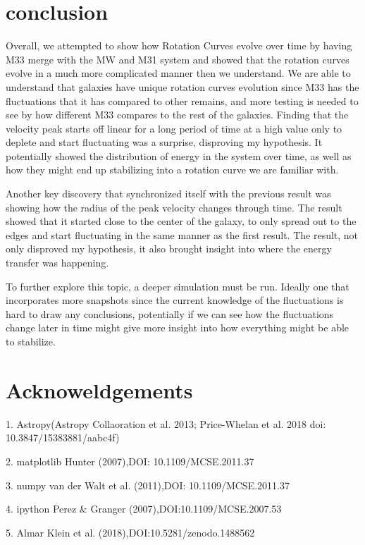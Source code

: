 \documentclass[modern]{aastex61}
\begin{document}
\section{conclusion}
Overall, we attempted to show how Rotation Curves evolve over time by having M33 merge with the MW and M31 system and showed that the rotation curves evolve in a much more complicated manner then we understand. We are able to understand that galaxies have unique rotation curves evolution since M33 has the fluctuations that it has compared to other remains, and more testing is needed to see by how different M33 compares to the rest of the galaxies.
Finding that the velocity peak starts off linear for a long period of time at a high value only to deplete and start fluctuating was a surprise, disproving my hypothesis. It potentially showed the distribution of energy in the system over time, as well as how they might end up stabilizing into a rotation curve we are familiar with. 

Another key discovery that synchronized itself with the previous result was showing how the radius of the peak velocity changes through time. The result showed that it started close to the center of the galaxy, to only spread out to the edges and start fluctuating in the same manner as the first result. The result, not only disproved my hypothesis, it also brought insight into where the energy transfer was happening. 

To further explore this topic, a deeper simulation must be run. Ideally one that incorporates more snapshots since the current knowledge of the fluctuations is hard to draw any conclusions, potentially if we can see how the fluctuations change later in time might give more insight into how everything might be able to stabilize. 


\section{Acknoweldgements}

1. Astropy(Astropy Collaoration et al. 2013; Price-Whelan et al. 2018 doi: 10.3847/15383881/aabc4f)

2. matplotlib Hunter (2007),DOI: 10.1109/MCSE.2011.37

3. numpy van der Walt et al. (2011),DOI: 10.1109/MCSE.2011.37

4. ipython Perez \& Granger (2007),DOI:10.1109/MCSE.2007.53

5. Almar Klein et al. (2018),DOI:10.5281/zenodo.1488562

\FloatBarrier
\nocite{*}



\end{document}
